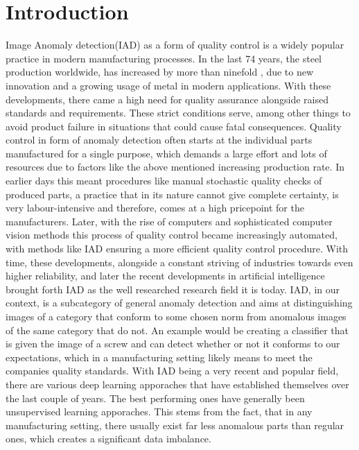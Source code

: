 \chapter{Introduction}
\label{chap:introduction}

Image Anomaly detection(IAD) as a form of quality control is a widely popular practice in modern manufacturing processes. In the last 74 years, the steel production worldwide, 
has increased by more than ninefold \cite{worldsteel}, due to new innovation and a growing usage of metal in modern applications. 
With these developments, there came a high need for quality 
assurance alongside raised standards and requirements. These strict conditions serve, among other things 
to avoid product failure in situations that could cause fatal consequences. Quality control in form of anomaly detection often 
starts at the individual parts manufactured for a single purpose, which demands a large effort and lots of resources due to factors like 
the above mentioned increasing production rate. 
In earlier days this meant procedures like manual stochastic quality checks of produced parts, a practice that in its nature cannot give 
complete certainty, is very labour-intensive and therefore, comes at a high pricepoint for the manufacturers. Later, with the rise of computers and sophisticated computer vision methods 
this process of quality control became increasingly automated, with methods like IAD ensuring a more efficient quality control procedure. With time, these developments, 
alongside a constant striving of industries towards even higher reliability, and later the recent developments in artificial intelligence brought forth IAD as the 
well researched research field it is today.\newline 
IAD, in our context, is a subcategory of general anomaly detection 
and aims at distinguishing images of a category that conform to some chosen norm from anomalous images of the same category that do not. 
An example would be creating a classifier that is given the image of a screw and can detect whether or not it conforms to our expectations, 
which in a manufacturing setting likely means to meet the companies quality standards.
\newline
With IAD being a very recent and popular field, there are various deep learning apporaches that have established themselves over 
the last couple of years. The best performing ones have generally been unsupervised learning apporaches. This stems from the fact, that 
in any manufacturing setting, there usually exist far less anomalous parts than regular ones, which creates a significant data imbalance. 
